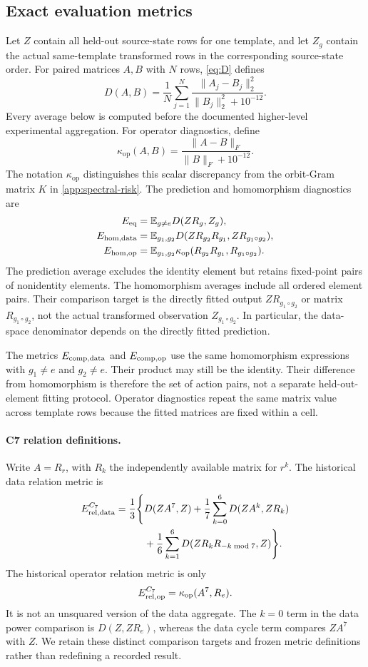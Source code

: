 \subsection{Exact evaluation metrics}
\label{app:metrics}

Let $Z$ contain all held-out source-state rows for one
template, and let $Z_g$ contain the actual same-template
transformed rows in the corresponding source-state order.
For paired matrices $A,B$ with $N$ rows,
\cref{eq:D} defines
\[
 D(A,B)
 =
 \frac1N\sum_{j=1}^N
 \frac{\|A_j-B_j\|_2^2}{\|B_j\|_2^2+10^{-12}}.
\]
Every average below is computed before the documented
higher-level experimental aggregation.
For operator diagnostics, define
\[
 \kappa_{\mathrm{op}}(A,B)
 =
 \frac{\|A-B\|_F}{\|B\|_F+10^{-12}}.
\]
The notation $\kappa_{\mathrm{op}}$ distinguishes this scalar
discrepancy from the orbit-Gram matrix $K$
in \cref{app:spectral-risk}.
The prediction and homomorphism diagnostics are
\begin{align*}
 E_{\mathrm{eq}}
 &=
 \mathbb E_{g\ne e}D(ZR_g,Z_g),
 \\
 E_{\mathrm{hom,data}}
 &=
 \mathbb E_{g_1,g_2}
 D(ZR_{g_2}R_{g_1},ZR_{g_1\circ g_2}),
 \\
 E_{\mathrm{hom,op}}
 &=
 \mathbb E_{g_1,g_2}
 \kappa_{\mathrm{op}}
 (R_{g_2}R_{g_1},R_{g_1\circ g_2}).
\end{align*}
The prediction average excludes the identity element but
retains fixed-point pairs of nonidentity elements.
The homomorphism averages include all ordered element pairs.
Their comparison target is the directly fitted output
$ZR_{g_1\circ g_2}$ or matrix $R_{g_1\circ g_2}$,
not the actual transformed observation $Z_{g_1\circ g_2}$.
In particular, the data-space denominator depends on the
directly fitted prediction.

The metrics $E_{\mathrm{comp,data}}$ and $E_{\mathrm{comp,op}}$ use the same
homomorphism expressions with $g_1\ne e$ and $g_2\ne e$.
Their product may still be the identity.
Their difference from homomorphism is therefore the set of
action pairs, not a separate held-out-element fitting protocol.
Operator diagnostics repeat the same matrix value across
template rows because the fitted matrices are fixed within
a cell.

\paragraph{C7 relation definitions.}
Write $A=R_r$, with $R_k$ the independently available matrix
for $r^k$.
The historical data relation metric is
\[
 \begin{aligned}
 E_{\mathrm{rel,data}}^{C_7}
 =
 \frac13\Bigg\{&
 D(ZA^7,Z)
 +
 \frac17\sum_{k=0}^6D(ZA^k,ZR_k)
 \\
 &+
 \frac16\sum_{k=1}^6
 D(ZR_kR_{-k\bmod7},Z)
 \Bigg\}.
 \end{aligned}
\]
The historical operator relation metric is only
\[
 E_{\mathrm{rel,op}}^{C_7}
 =
 \kappa_{\mathrm{op}}(A^7,R_e).
\]
It is not an unsquared version of the data aggregate.
The $k=0$ term in the data power comparison is
$D(Z,ZR_e)$, whereas the data cycle term compares $ZA^7$
with $Z$.
We retain these distinct comparison targets and frozen metric
definitions rather than redefining a recorded result.

